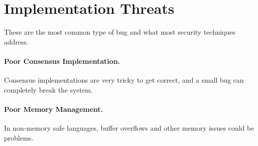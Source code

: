 
\section{Implementation Threats}
These are the most common type of bug and what most security techniques address.

\paragraph{Poor Consensus Implementation.} Consensus implementations are very tricky to get correct, and a small bug can completely break the system.

\paragraph{Poor Memory Management.} In non-memory safe languages, buffer overflows and other memory issues could be problems.
